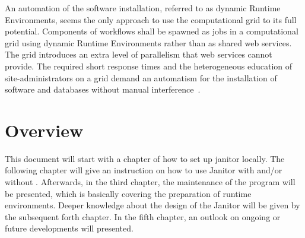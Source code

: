An automation of the software installation, referred to as dynamic Runtime Environments, seems the only
approach to use the computational grid to its full potential. Components of workflows shall be spawned
as jobs in a computational grid using dynamic Runtime Environments rather than as shared web services.
The grid introduces an extra level of parallelism that web services cannot provide. The required short
response times and the heterogeneous education of site-administrators on a grid demand an automatism for
the installation of software and databases without manual interference~\cite{BAYER_2007}.

\section{Overview}

This document will start with a chapter of how to set up janitor locally. The following chapter will give an instruction on how to 
use Janitor with \AREX and/or without \AREX. Afterwards, in the third chapter, the maintenance of the program will be presented, 
which is basically covering the preparation of runtime environments. Deeper knowledge about the design of the Janitor will 
be given by the subsequent forth chapter. In the fifth chapter, an outlook on ongoing or future developments will presented.






 

